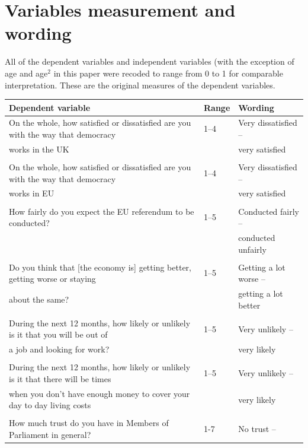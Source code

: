 \documentclass[12pt, letter]{article}
\begin{document}
\section{Variables measurement and wording} \label{dvrangewording}

All of the dependent variables and independent variables (with the exception of age and age$^2$ in this paper were recoded to range from 0 to 1 for comparable interpretation. These are the original measures of the dependent variables. 

\scriptsize
\begin{center}
\begin{longtable}{lll}
\toprule[1pt]
Dependent variable & Range & Wording \\
\toprule[1pt]
On the whole, how satisfied or dissatisfied are you with the way that democracy  & 1--4 & Very dissatisfied --  \\
works in the UK && very satisfied\\
 \\[-4pt]
On the whole, how satisfied or dissatisfied are you with the way that democracy  & 1--4 & Very dissatisfied --  \\
works in EU && very satisfied\\
 \\[-4pt]
How fairly do you expect the EU referendum to be conducted? & 1--5 & Conducted fairly --  \\
&& conducted unfairly\\
 \\[-4pt]
Do you think that {[}the economy is{]} getting better, getting worse or staying  & 1--5 & Getting a lot worse --  \\
about the same? && getting a lot better\\
 \\[-4pt]
During the next 12 months, how likely or unlikely is it that you will be out of  & 1--5 & Very unlikely --  \\
a job and looking for work?&& very likely\\
 \\[-4pt]
During the next 12 months, how likely or unlikely is it that there will be times  & 1--5 & Very unlikely -- \\
when you don’t have enough money to cover your day to day living costs & & very likely \\
 \\[-4pt]
How much trust do you have in Members of Parliament in general? & 1-7 & No trust --  \\

\end{longtable}
\end{center}
\end{document}
